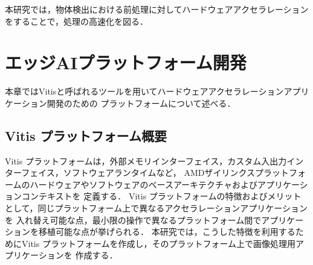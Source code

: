 \documentclass[11pt,a4j]{jreport}
\begin{document}
本研究では，物体検出における前処理に対してハードウェアアクセラレーションをすることで，処理の高速化を図る．
%
\chapter{エッジAIプラットフォーム開発}
本章ではVitisと呼ばれるツールを用いてハードウェアアクセラレーションアプリケーション開発のための
プラットフォームについて述べる．
\section{Vitis プラットフォーム概要}
Vitis プラットフォーム\cite{VitisPlatform}は，外部メモリインターフェイス，カスタム入出力インターフェイス，ソフトウェアランタイムなど，
AMDザイリンクスプラットフォームのハードウェアやソフトウェアのベースアーキテクチャおよびアプリケーションコンテキストを
定義する．
Vitis プラットフォームの特徴およびメリットとして，同じプラットフォーム上で異なるアクセラレーションアプリケーションを
入れ替え可能な点，最小限の操作で異なるプラットフォーム間でアプリケーションを移植可能な点が挙げられる．
本研究では，こうした特徴を利用するためにVitis プラットフォームを作成し，そのプラットフォーム上で画像処理用アプリケーションを
作成する．

\end{document}
